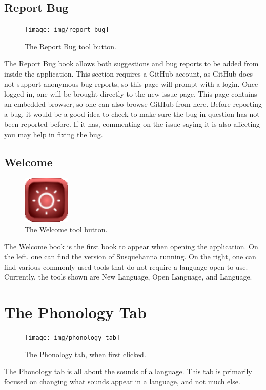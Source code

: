\documentclass{report}
\begin{document}
	\section{Report Bug}
	\begin{figure}
		\centering
		\texttt{[image: img/report-bug]}
		\caption{The Report Bug tool button.}
		\label{fig:report-bug}
	\end{figure}
	The Report Bug book allows both suggestions and bug reports to be added from inside the application. This section requires a GitHub account, as GitHub does not support anonymous bug reports, so this page will prompt with a login. Once logged in, one will be brought directly to the new issue page. This page contains an embedded browser, so one can also browse GitHub from here. Before reporting a bug, it would be a good idea to check to make sure the bug in question has not been reported before. If it has, commenting on the issue saying it is also affecting you may help in fixing the bug.
	\section{Welcome}
	\begin{figure}
		\centering
		\includegraphics[width=0.2\textwidth]{img/welcome}
		\caption{The Welcome tool button.}
		\label{fig:welcome}
	\end{figure}
	The Welcome book is the first book to appear when opening the application. On the left, one can find the version of Susquehanna running. On the right, one can find various commonly used tools that do not require a language open to use. Currently, the tools shown are New Language, Open Language, and Language.
	
	\chapter{The Phonology Tab}
	\begin{figure}[ht]
		\centering
		\texttt{[image: img/phonology-tab]}
		\caption{The Phonology tab, when first clicked.}
		\label{fig:phonology-tab}
	\end{figure}
	The Phonology tab is all about the sounds of a language. This tab is primarily focused on changing what sounds appear in a language, and not much else.
	\newpage
\end{document}
